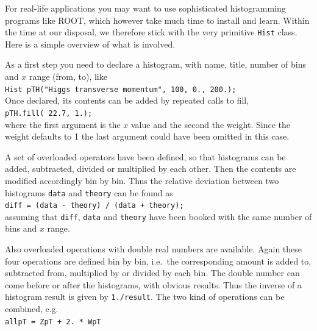 \documentclass[12pt,a4paper]{article}
\begin{document}
For real-life applications you may want to use sophisticated 
histogramming programs like ROOT, which however take much time to
install and learn. Within the time at our disposal, we therefore 
stick with the very primitive \texttt{Hist} class. Here is a 
simple overview of what is involved. 

As a first step you need to declare a histogram, with name, title, 
number of bins and $x$ range (from, to), like\\
\hspace*{10mm}\texttt{Hist pTH("Higgs transverse momentum", 100, 0., 200.);}\\
Once declared, its contents can be added by repeated calls to fill,\\
\hspace*{10mm}\texttt{pTH.fill( 22.7, 1.);}\\ 
where the first argument is the $x$ value and the second the weight. 
Since the weight defaults to 1 the last argument could have been omitted 
in this case.

A set of overloaded operators have been defined, so that histograms can be 
added, subtracted, divided or multiplied by each other. Then the contents 
are modified accordingly bin by bin. Thus the relative deviation between 
two histograms \texttt{data} and \texttt{theory} can be found as\\
\hspace*{10mm}\texttt{diff = (data - theory) / (data + theory);}\\
assuming that \texttt{diff}, \texttt{data} and \texttt{theory} have been 
booked with the same number of bins and $x$ range. 

Also overloaded operations with double real numbers are available. Again 
these four operations are defined bin by bin, i.e.\ the corresponding 
amount is added to, subtracted from, multiplied by or divided by each bin. 
The double number can come before or after the histograms, with obvious 
results. Thus the inverse of a histogram result is given by 
\texttt{1./result}. The two kind of operations can be combined, e.g.\\
\hspace*{10mm}\texttt{allpT = ZpT + 2. * WpT}
\end{document}
